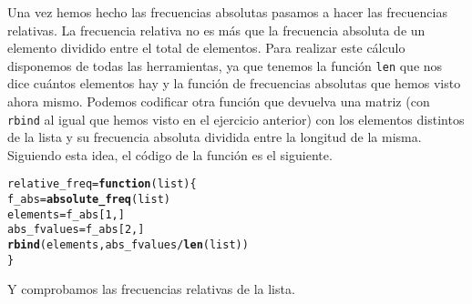 \documentclass[12pt]{report}\usepackage[]{graphicx}\usepackage[dvipsnames]{xcolor}
\makeatletter
\newcommand{\hlnum}[1]{\textcolor[rgb]{0.686,0.059,0.569}{#1}}%
\newcommand{\hlopt}[1]{\textcolor[rgb]{0,0,0}{#1}}%
\newcommand{\hlstd}[1]{\textcolor[rgb]{0.345,0.345,0.345}{#1}}%
\newcommand{\hlkwa}[1]{\textcolor[rgb]{0.161,0.373,0.58}{\textbf{#1}}}%
\newcommand{\hlkwb}[1]{\textcolor[rgb]{0.69,0.353,0.396}{#1}}%
\newcommand{\hlkwc}[1]{\textcolor[rgb]{0.333,0.667,0.333}{#1}}%
\newcommand{\hlkwd}[1]{\textcolor[rgb]{0.737,0.353,0.396}{\textbf{#1}}}%
\newenvironment{kframe}{%
 \def\at@end@of@kframe{}%
 \ifinner\ifhmode%
  \def\at@end@of@kframe{\end{minipage}}%
  \begin{minipage}{\columnwidth}%
 \fi\fi%
 \def\FrameCommand##1{\hskip\@totalleftmargin \hskip-\fboxsep
 \colorbox{shadecolor}{##1}\hskip-\fboxsep
     \hskip-\linewidth \hskip-\@totalleftmargin \hskip\columnwidth}%
 \MakeFramed {\advance\hsize-\width
   \@totalleftmargin\z@ \linewidth\hsize
   \@setminipage}}%
 {\par\unskip\endMakeFramed%
 \at@end@of@kframe}
\newenvironment{knitrout}{}{} %
\makeatother
\begin{document}
			Una vez hemos hecho las frecuencias absolutas pasamos a hacer las frecuencias relativas. La frecuencia relativa no es más que la frecuencia absoluta de un elemento dividido entre el total de elementos. Para realizar este cálculo disponemos de todas las herramientas, ya que tenemos la función \texttt{len} que nos dice cuántos elementos hay y la función de frecuencias absolutas que hemos visto ahora mismo. Podemos codificar otra función que devuelva una matriz (con \texttt{rbind} al igual que hemos visto en el ejercicio anterior) con los elementos distintos de la lista y su frecuencia absoluta dividida entre la longitud de la misma. Siguiendo esta idea, el código de la función es el siguiente.
			
\begin{knitrout}
\color{fgcolor}\begin{kframe}
\begin{alltt}
\hlstd{relative_freq} \hlkwb{=} \hlkwa{function}\hlstd{(}\hlkwc{list}\hlstd{)\{}
        \hlstd{f_abs} \hlkwb{=} \hlkwd{absolute_freq}\hlstd{(list)}
        \hlstd{elements} \hlkwb{=} \hlstd{f_abs[}\hlnum{1}\hlstd{,]}
        \hlstd{abs_fvalues} \hlkwb{=} \hlstd{f_abs[}\hlnum{2}\hlstd{,]}
        \hlkwd{rbind}\hlstd{(elements,abs_fvalues}\hlopt{/}\hlkwd{len}\hlstd{(list))}
\hlstd{\}}
\end{alltt}
\end{kframe}
\end{knitrout}
			
			Y comprobamos las frecuencias relativas de la lista.
			
\end{document}
